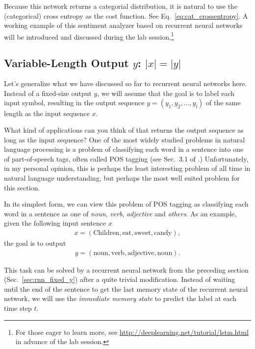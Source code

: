 \documentclass{report}
\begin{document}
Because this network returns a categorial distribution, it is natural to use the
(categorical) cross entropy as the cost function. See
Eq.~\eqref{eq:cat_crossentropy}. A working example of this sentiment analyzer
based on recurrent neural networks will be introduced and discussed during the
lab session.\footnote{
    For those eager to learn more, see
    \url{http://deeplearning.net/tutorial/lstm.html} in advance of the lab
    session.
}


\subsection{Variable-Length Output $y$: $|x|=|y|$}
\label{sec:rnn_x_y}

Let's generalize what we have discussed so far to recurrent neural networks
here. Instead of a fixed-size output $y$, we will assume that the goal is to
label each input symbol, resulting in the output sequence $y=(y_1, y_2, \ldots,
y_l)$ of the same length as the input sequence $x$.

What kind of applications can you think of that returns the output sequence as
long as the input sequence? One of the most widely studied problems in natural
language processing is a problem of classifying each word in a sentence into one
of part-of-speech tags, often called POS tagging (see Sec.~3.1 of
\cite{manning1999foundations}.) Unfortunately, in my personal opinion, this is
perhaps the least interesting problem of all time in natural language
understanding, but perhaps the most well suited problem for this section.

In its simplest form, we can view this problem of POS tagging as classifying
each word in a sentence as one of {\em noun}, {\em verb}, {\em adjective} and
{\em others}. As an example, given the following input sentence $x$
\begin{align*}
    x = (\text{Children}, \text{eat}, \text{sweet}, \text{candy}),
\end{align*}
the goal is to output
\begin{align*}
    y = (\text{noun}, \text{verb}, \text{adjective}, \text{noun}).
\end{align*}

This task can be solved by a recurrent neural network from the preceding section
(Sec.~\ref{sec:rnn_fixed_y}) after a quite trivial modification. Instead of
waiting until the end of the sentence to get the last memory state of the
recurrent neural network, we will use the {\em immediate memory state} to
predict the label at each time step $t$. 
\end{document}
